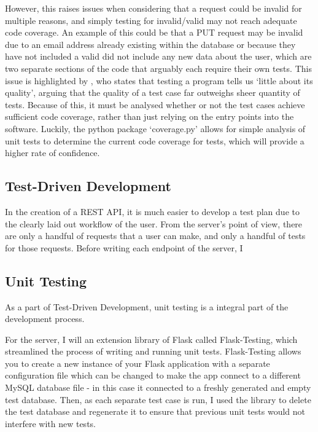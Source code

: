 However, this raises issues when considering that a request could be invalid for multiple reasons, and simply testing for invalid/valid may not reach adequate code coverage.
An example of this could be that a PUT request may be invalid due to an email address already existing within the database or because they have not included a valid did not include any new data about the user, which are two separate sections of the code that arguably each require their own tests.
This issue is highlighted by \cite{4597151}, who states that testing a program tells us `little about its quality', arguing that the quality of a test case far outweighs sheer quantity of tests.
Because of this, it must be analysed whether or not the test cases achieve sufficient code coverage, rather than just relying on the entry points into the software.
Luckily, the python package `coverage.py' allows for simple analysis of unit tests to determine the current code coverage for tests, which will provide a higher rate of confidence.

\subsection{Test-Driven Development}
In the creation of a REST API, it is much easier to develop a test plan due to the clearly laid out workflow of the user. From the server's point of view, there are only a handful of requests that a user can make, and only a handful of tests for those requests. Before writing each endpoint of the server, I 

\subsection{Unit Testing} 
As a part of Test-Driven Development, unit testing is a integral part of the development process.


For the server, I will an extension library of Flask called Flask-Testing, which streamlined the process of writing and running unit tests.
Flask-Testing allows you to create a new instance of your Flask application with a separate configuration file which can be changed to make the app connect to a different MySQL database file - in this case it connected to a freshly generated and empty test database.
Then, as each separate test case is run, I used the library to delete the test database and regenerate it to ensure that previous unit tests would not interfere with new tests.

